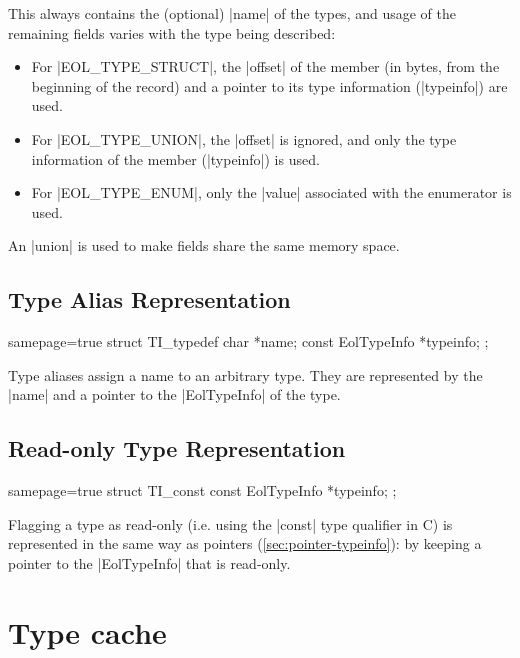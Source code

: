 \noindent
This always contains the (optional) \Mc|name| of the types, and usage of the
remaining fields varies with the type being described:

\begin{itemize}
  \item For \Mc|EOL_TYPE_STRUCT|, the \Mc|offset| of the member (in bytes,
    from the beginning of the record) and a pointer to its type information
    (\Mc|typeinfo|) are used.
  \item For \Mc|EOL_TYPE_UNION|, the \Mc|offset| is ignored, and only the
    type information of the member (\Mc|typeinfo|) is used.
  \item For \Mc|EOL_TYPE_ENUM|, only the \Mc|value| associated with the
    enumerator is used.
\end{itemize}

\noindent
An \Mc|union| is used to make fields share the same memory space.


\subsection{Type Alias Representation}

\begin{ccode*}{samepage=true}
  struct TI_typedef {
    char              *name;
    const EolTypeInfo *typeinfo;
  };
\end{ccode*}

Type aliases assign a name to an arbitrary type. They are represented by the
\Mc|name| and a pointer to the \Mc|EolTypeInfo| of the type.


\subsection{Read-only Type Representation}

\begin{ccode*}{samepage=true}
  struct TI_const {
    const EolTypeInfo *typeinfo;
  };
\end{ccode*}

\noindent
Flagging a type as read-only (i.e. using the \Mc|const| type qualifier in C)
is represented in the same way as pointers (\autoref{sec:pointer-typeinfo}):
by keeping a pointer to the \Mc|EolTypeInfo| that is read-only.




\section{Type cache}

